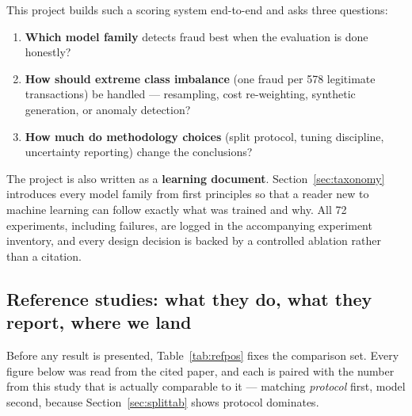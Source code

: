 \documentclass[11pt,a4paper]{article}
\newcommand{\term}[1]{\textbf{\textcolor{accent}{#1}}}
\begin{document}
This project builds such a scoring system end-to-end and asks three questions:

\begin{enumerate}[leftmargin=*]
      \item \textbf{Which model family} detects fraud best when the evaluation is done honestly?
      \item \textbf{How should extreme class imbalance} (one fraud per 578 legitimate transactions)
            be handled --- resampling, cost re-weighting, synthetic generation, or anomaly detection?
      \item \textbf{How much do methodology choices} (split protocol, tuning discipline,
            uncertainty reporting) change the conclusions?
\end{enumerate}

The project is also written as a \term{learning document}. Section~\ref{sec:taxonomy}
introduces every model family from first principles so that a reader new to machine learning
can follow exactly what was trained and why. All 72 experiments, including failures, are
logged in the accompanying experiment inventory, and every design decision is backed by a
controlled ablation rather than a citation.

\subsection{Reference studies: what they do, what they report, where we land}
\label{sec:refstudies}
Before any result is presented, Table~\ref{tab:refpos} fixes the comparison set. Every figure
below was read from the cited paper, and each is paired with the number from this study that is
actually comparable to it --- matching \emph{protocol} first, model second, because
Section~\ref{sec:splittab} shows protocol dominates.
\end{document}
